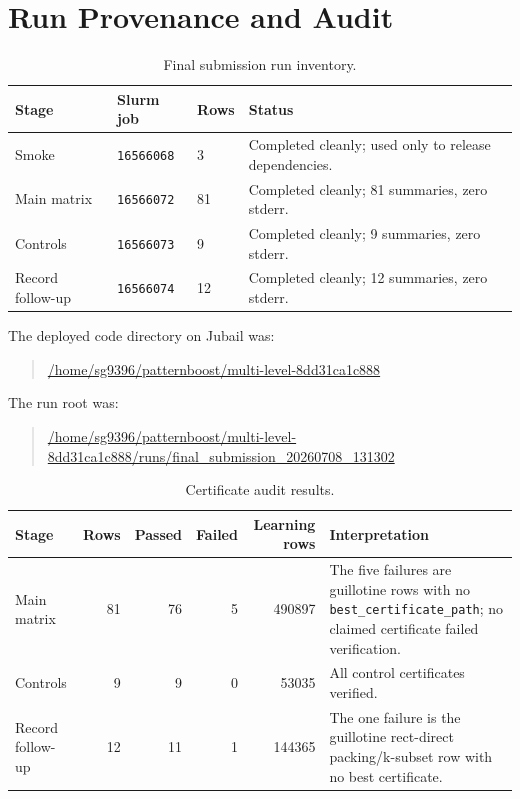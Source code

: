 \documentclass[11pt]{article}
\newcommand{\code}[1]{\texttt{#1}}
\newcommand{\artifact}[1]{{\footnotesize\url{#1}}}
\begin{document}
\section{Run Provenance and Audit}

\begin{table}[htbp]
\centering
\caption{Final submission run inventory.}
\begin{tabularx}{\textwidth}{p{}p{}p{}X}
\toprule
Stage & Slurm job & Rows & Status \\
\midrule
Smoke & \code{16566068} & 3 & Completed cleanly; used only to release dependencies. \\
Main matrix & \code{16566072} & 81 & Completed cleanly; 81 summaries, zero stderr. \\
Controls & \code{16566073} & 9 & Completed cleanly; 9 summaries, zero stderr. \\
Record follow-up & \code{16566074} & 12 & Completed cleanly; 12 summaries, zero stderr. \\
\bottomrule
\end{tabularx}
\end{table}

The deployed code directory on Jubail was:
\begin{quote}
\artifact{/home/sg9396/patternboost/multi-level-8dd31ca1c888}
\end{quote}
The run root was:
\begin{quote}
\artifact{/home/sg9396/patternboost/multi-level-8dd31ca1c888/runs/final_submission_20260708_131302}
\end{quote}

\begin{table}[htbp]
\centering
\caption{Certificate audit results.}
\begin{tabularx}{\textwidth}{p{}rrrrX}
\toprule
Stage & Rows & Passed & Failed & Learning rows & Interpretation \\
\midrule
Main matrix & 81 & 76 & 5 & 490897 & The five failures are guillotine rows with no
\code{best\_certificate\_path}; no claimed certificate failed verification. \\
Controls & 9 & 9 & 0 & 53035 & All control certificates verified. \\
Record follow-up & 12 & 11 & 1 & 144365 & The one failure is the guillotine
rect-direct packing/k-subset row with no best certificate. \\
\bottomrule
\end{tabularx}
\end{table}
\end{document}
